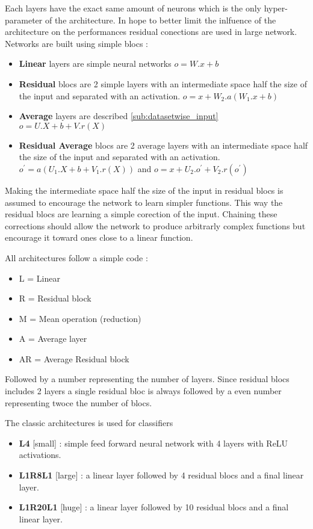 Each layers have the exact same amount of neurons which is the only hyper-parameter of the architecture.
In hope to better limit the inlfuence of the architecture on the performances residual conections are used in large network.
Networks are built using simple blocs :
\begin{itemize}
	\item \textbf{Linear} layers are simple neural networks $o = W.x + b$
	\item \textbf{Residual} blocs are 2 simple layers with an intermediate space half the size of the input and separated with an activation. $o = x + W_2 . a(W_1.x + b)$
	\item \textbf{Average} layers are described \autoref{sub:datasetwise_input} $o = U.X+b+V.r(X)$
	\item \textbf{Residual Average} blocs are 2 average layers with an intermediate space half the size of the input and separated with an activation. $o^\prime = a( U_1.X+b+V_1.r(X) )$ and $o = x + U_2.o^\prime + V_2.r(o^\prime) $
\end{itemize}
Making the intermediate space half the size of the input in residual blocs is assumed to encourage the network to learn simpler functions.
This way the residual blocs are learning a simple corection of the input.
Chaining these corrections should allow the network to produce arbitrarly complex functions but encourage it toward ones close to a linear function.

All architectures follow a simple code :
\begin{itemize}
	\item L = Linear
	\item R = Residual block
	\item M = Mean operation (reduction)
	\item A = Average layer
	\item AR = Average Residual block
\end{itemize}
Followed by a number representing the number of layers.
Since residual blocs includes 2 layers a single residual bloc is always followed by a even number representing twoce the number of blocs.

The classic architectures is used for classifiers
\begin{itemize}
	\item \textbf{L4} [small] : simple feed forward neural network with 4 layers with ReLU activations.
	\item \textbf{L1R8L1} [large] : a linear layer followed by 4 residual blocs and a final linear layer.
	\item \textbf{L1R20L1} [huge] : a linear layer followed by 10 residual blocs and a final linear layer.
\end{itemize}

